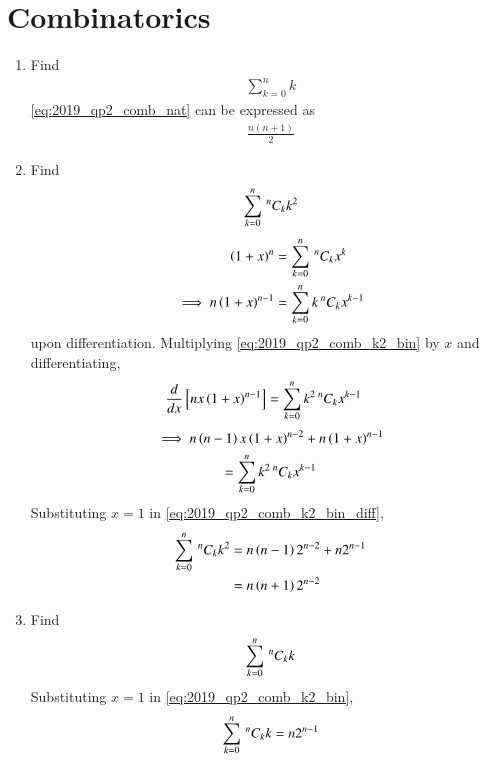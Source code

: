 \section{Combinatorics}
\renewcommand{\theequation}{\theenumi}
\begin{enumerate}[label=\arabic*.,ref=\thesubsection.\theenumi]
\item Find 
\begin{align}
\label{eq:2019_qp2_comb_nat}
\sum_{k=0}^{n}k
\end{align}
\solution  \eqref{eq:2019_qp2_comb_nat} can be expressed as
\begin{align}
\label{eq:2019_qp2_comb_nat_sol}
\frac{n(n+1)}{2}
\end{align}
\item Find 
\begin{align}
\label{eq:2019_qp2_comb_k2}
\sum_{k=0}^{n}\,^{n}C_{k}k^2
\end{align}
\solution 
\begin{align}
\label{eq:2019_qp2_comb}
\left(1+x\right)^n&=\sum_{k=0}^{n}\,^{n}C_{k}x^k
\\
\implies n\left(1+x\right)^{n-1}&=\sum_{k=0}^{n}k\,^{n}C_{k}x^{k-1}
\label{eq:2019_qp2_comb_k2_bin}
\end{align}
upon differentiation. Multiplying \eqref{eq:2019_qp2_comb_k2_bin} by $x$ and differentiating,
\begin{align}
\frac{d}{dx} {}\left[nx\left(1+x\right)^{n-1}\right]&=\sum_{k=0}^{n}k^2\,^{n}C_{k}x^{k-1}
\end{align}
\begin{multline}
\implies n\left(n-1\right)x\left(1+x\right)^{n-2}+n\left(1+x\right)^{n-1}  
\\
=\sum_{k=0}^{n}k^2\,^{n}C_{k}x^{k-1}
\label{eq:2019_qp2_comb_k2_bin_diff}
\end{multline}
%
Substituting $x=1$ in \eqref{eq:2019_qp2_comb_k2_bin_diff},
\begin{align}
\sum_{k=0}^{n}\,^{n}C_{k}k^2 &= n\left(n-1\right)2^{n-2}+n2^{n-1}
\nonumber \\
&= n\left(n+1\right)2^{n-2}
\label{eq:2019_qp2_comb_k2_bin_sol}
\end{align}
\item Find 
\begin{align}
\label{eq:2019_qp2_comb_k}
\sum_{k=0}^{n}\,^{n}C_{k}k
\end{align}
\solution Substituting $x=1$ in \eqref{eq:2019_qp2_comb_k2_bin},
\begin{align}
\label{eq:2019_qp2_comb_k_sol} 
\sum_{k=0}^{n}\nCr{n}{k}k= n2^{n-1}

\end{align}
\end{enumerate}
